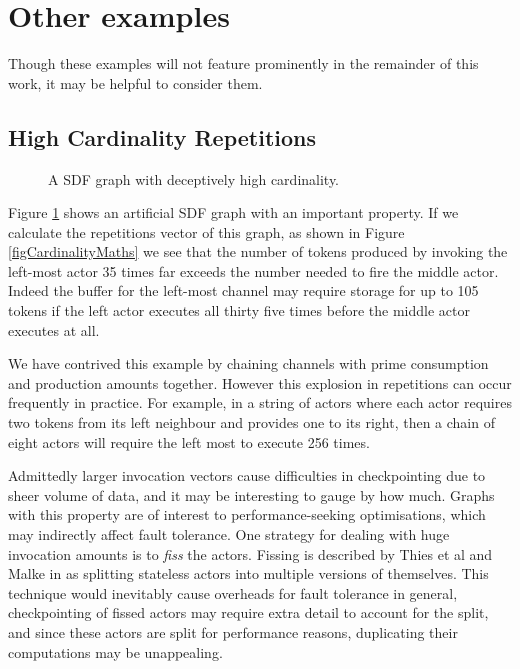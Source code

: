 \section{Other examples}

Though these examples will not feature prominently in the remainder of this work, it may be helpful to consider them.

\subsection{High Cardinality Repetitions}

\begin{figure}
\begin{center}
	
\caption{A SDF graph with deceptively high cardinality.}
\label{figCardinality}
\end{center}
\end{figure}

Figure \ref{figCardinality} shows an artificial SDF graph with an important property.
If we calculate the repetitions vector of this graph, as shown in Figure \ref{figCardinalityMaths} we see that the number of tokens produced by invoking the left-most actor 35 times far exceeds the number needed to fire the middle actor.
Indeed the buffer for the left-most channel may require storage for up to 105 tokens if the left actor executes all thirty five times before the middle actor executes at all.

We have contrived this example by chaining channels with prime consumption and production amounts together.
However this explosion in repetitions can occur frequently in practice.
For example, in a string of actors where each actor requires two tokens from its left neighbour and provides one to its right, then a chain of eight actors will require the left most to execute 256 times.

Admittedly larger invocation vectors cause difficulties in checkpointing due to sheer volume of data, and it may be interesting to gauge by how much.
Graphs with this property are of interest to performance-seeking optimisations, which may indirectly affect fault tolerance.
One strategy for dealing with huge invocation amounts is to {\em fiss} the actors.
Fissing is described by Thies et al and Malke in \cite{thies02, mal08} as splitting stateless actors into multiple versions of themselves.
This technique would inevitably cause overheads for fault tolerance in general, checkpointing of fissed actors may require extra detail to account for the split, and since these actors are split for performance reasons, duplicating their computations may be unappealing.

